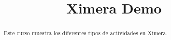 \documentclass{xourse}
\title{Ximera Demo}
\begin{document}
  
\begin{abstract} %
Este curso muestra los diferentes tipos de actividades en Ximera.  
\end{abstract}  
\maketitle  
 
 
\end{document}
